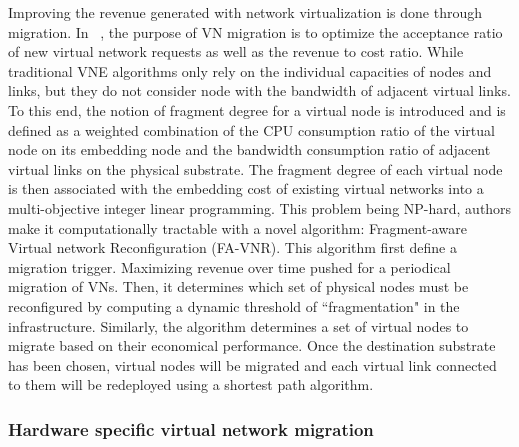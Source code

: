 Improving the revenue generated with network virtualization is done through migration.
In ~\cite{fragment-Liu2018}, the purpose of VN migration is to optimize the acceptance ratio of new virtual network requests as well as the revenue to cost ratio.
While traditional VNE algorithms only rely on the individual capacities of nodes and links, but they do not consider node with the bandwidth of adjacent virtual links.
To this end, the notion of fragment degree for a virtual node is introduced and is defined as a weighted combination of the CPU consumption ratio of the virtual node on its embedding node and the bandwidth consumption ratio of adjacent virtual links on the physical substrate.
The fragment degree of each virtual node is then associated with the embedding cost of existing virtual networks into a multi-objective integer linear programming. This problem being NP-hard, authors make it computationally tractable with a novel algorithm: Fragment-aware Virtual network Reconfiguration (FA-VNR).
This algorithm first define a migration trigger. Maximizing revenue over time pushed for a periodical migration of VNs.
Then, it determines which set of physical nodes must be reconfigured by computing a dynamic threshold of ``fragmentation" in the infrastructure.
Similarly, the algorithm determines a set of virtual nodes to migrate based on their economical performance.
Once the destination substrate has been chosen, virtual nodes will be migrated and each virtual link connected to them will be redeployed using a shortest path algorithm.

\subsubsection{Hardware specific virtual network migration}

